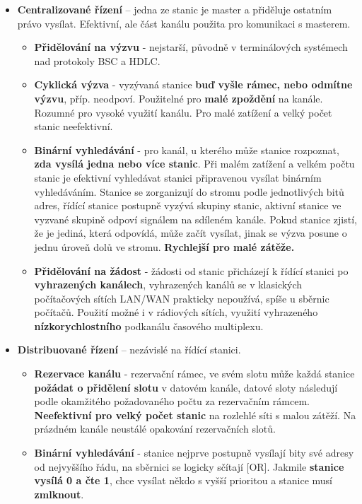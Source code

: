 \begin{itemize}
	\item \textbf{Centralizované řízení} -- jedna ze stanic je master a přiděluje ostatním právo vysílat. Efektivní, ale část kanálu použita pro komunikaci s masterem.
	\begin{itemize}
	\item \textbf{Přidělování na výzvu} - nejstarší, původně v terminálových systémech nad protokoly BSC a HDLC.
	\item \textbf{Cyklická výzva} - vyzývaná stanice \textbf{buď vyšle rámec, nebo odmítne výzvu}, příp. neodpoví. Použitelné pro \textbf{malé zpoždění} na kanále. Rozumné pro vysoké využití kanálu. Pro malé zatížení a velký počet stanic neefektivní.
	\item \textbf{Binární vyhledávání} - pro kanál, u kterého může stanice rozpoznat,\textbf{ zda vysílá jedna nebo více stanic}. Při malém zatížení a velkém počtu stanic je efektivní vyhledávat stanici připravenou vysílat binárním vyhledáváním. Stanice se zorganizují do stromu podle jednotlivých bitů adres, řídící stanice postupně vyzývá skupiny stanic, aktivní stanice ve vyzvané skupině odpoví signálem na sdíleném kanále. Pokud stanice zjistí, že je jediná, která odpovídá, může začít vysílat, jinak se výzva posune o jednu úroveň dolů ve stromu. \textbf{Rychlejší pro malé zátěže.}
	\item \textbf{Přidělování na žádost} - žádosti od stanic přicházejí k řídící stanici po \textbf{vyhrazených kanálech}, vyhrazených kanálů se v klasických počítačových sítích LAN/WAN prakticky nepoužívá, spíše u sběrnic počítačů. Použití možné i v rádiových sítích, využití vyhrazeného \textbf{nízkorychlostního} podkanálu časového multiplexu.
	\end{itemize}
	\item \textbf{Distribuované řízení} -- nezávislé na řídící stanici.
	\begin{itemize}
					\item \textbf{Rezervace kanálu} - rezervační rámec, ve svém slotu může každá stanice \textbf{požádat o přidělení slotu} v datovém kanále, datové sloty následují podle okamžitého požadovaného počtu za rezervačním rámcem. \textbf{Neefektivní pro velký počet stanic} na rozlehlé síti s malou zátěží. Na prázdném kanále neustálé opakování rezervačních slotů.
					\item \textbf{Binární vyhledávání} -  stanice nejprve postupně vysílají bity své adresy od nejvyššího řádu, na sběrnici se logicky sčítají [OR]. Jakmile \textbf{stanice vysílá 0 a čte 1}, chce vysílat někdo s vyšší prioritou a stanice musí \textbf{zmlknout}.

\end{itemize}
\end{itemize}

